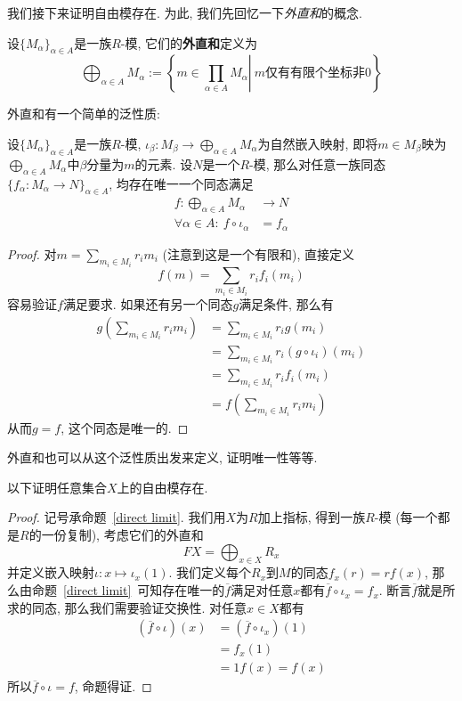 我们接下来证明自由模存在.
为此, 我们先回忆一下\textit{外直和}的概念.
\begin{defn}
    设$\{M_\alpha\}_{\alpha\in A}$是一族$R$-模, 它们的\textbf{外直和}定义为
    \[\bigoplus_{\alpha\in A}M_\alpha:=\left\{\left.m\in\prod_{\alpha\in A}M_\alpha\right|\ m\text{仅有有限个坐标非}0\right\}\]
\end{defn}

外直和有一个简单的泛性质:
\begin{prop}\label{direct limit}
    设$\{M_\alpha\}_{\alpha\in A}$是一族$R$-模, $\displaystyle\iota_\beta:M_\beta\to\bigoplus_{\alpha\in A}M_\alpha$为自然嵌入映射,
    即将$m\in M_\beta$映为$\displaystyle\bigoplus_{\alpha\in A}M_\alpha$中$\beta$分量为$m$的元素.
    设$N$是一个$R$-模, 那么对任意一族同态$\{f_\alpha:M_\alpha\to N\}_{\alpha\in A}$, 均存在唯一一个同态满足
    \begin{align*}
        f:\bigoplus_{\alpha\in A}M_\alpha&\to N\\
        \forall\alpha\in A:\ f\circ\iota_\alpha&=f_\alpha
    \end{align*}
\end{prop}
\begin{proof}
    对$\displaystyle m=\sum_{m_i\in M_i}r_im_i$ (注意到这是一个有限和), 直接定义
    \[f(m)=\sum_{m_i\in M_i}r_if_i(m_i)\]
    容易验证$f$满足要求.
    如果还有另一个同态$g$满足条件, 那么有
    \begin{align*}
        g\left(\sum_{m_i\in M_i}r_im_i\right)&=\sum_{m_i\in M_i}r_ig(m_i)\\
        &=\sum_{m_i\in M_i}r_i(g\circ\iota_i)(m_i)\\
        &=\sum_{m_i\in M_i}r_if_i(m_i)\\
        &=f\left(\sum_{m_i\in M_i}r_im_i\right)
    \end{align*}
    从而$g=f$, 这个同态是唯一的.
\end{proof}

外直和也可以从这个泛性质出发来定义, 证明唯一性等等.

以下证明任意集合$X$上的自由模存在.
\begin{proof}
    记号承命题~\ref{direct limit}.
    我们用$X$为$R$加上指标, 得到一族$R$-模 (每一个都是$R$的一份复制), 考虑它们的外直和
    \[FX=\bigoplus_{x\in X}R_x\]
    并定义嵌入映射$\iota:x\mapsto\iota_x(1)$.
    我们定义每个$R_x$到$M$的同态$f_x(r)=rf(x)$, 那么由命题~\ref{direct limit}~可知存在唯一的$\overline{f}$满足对任意$x$都有$\overline{f}\circ\iota_x=f_x$.
    断言$\overline{f}$就是所求的同态, 那么我们需要验证交换性. 对任意$x\in X$都有
    \begin{align*}
        (\overline{f}\circ\iota)(x)&=(\overline{f}\circ\iota_x)(1)\\
        &=f_x(1)\\
        &=1f(x)=f(x)
    \end{align*}
    所以$\overline{f}\circ\iota=f$, 命题得证.
\end{proof}

